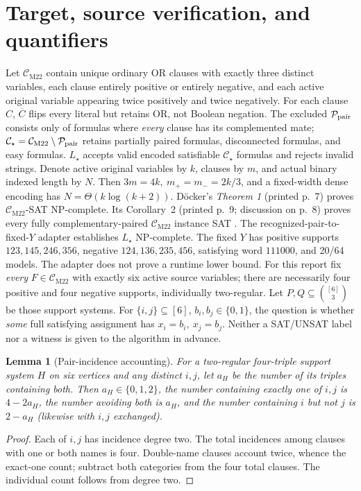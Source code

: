 \documentclass[11pt]{article}
\newtheorem{lemma}[theorem]{Lemma}
\newcommand{\CM}{\mathcal C_{\mathrm{M22}}}
\newcommand{\CS}{\mathcal C_{\star}}
\begin{document}
\section{Target, source verification, and quantifiers}
Let \(\CM\) contain unique ordinary OR clauses with exactly three distinct variables, each clause entirely positive or entirely negative, and each active original variable appearing twice positively and twice negatively. For each clause \(C\), \(\overline C\) flips every literal but retains OR, not Boolean negation. The excluded \(\mathcal P_{\rm pair}\) consists only of formulas where \emph{every} clause has its complemented mate; \(\CS=\CM\setminus\mathcal P_{\rm pair}\) retains partially paired formulas, disconnected formulas, and easy formulas. \(L_\star\) accepts valid encoded satisfiable \(\CS\) formulas and rejects invalid strings. Denote active original variables by \(k\), clauses by \(m\), and actual binary indexed length by \(N\). Then \(3m=4k,\ m_+=m_-=2k/3\), and a fixed-width dense encoding has \(N=\Theta(k\log(k+2))\).
D\"ocker's \emph{Theorem 1} (printed p.~7) proves \(\CM\)-SAT NP-complete. Its Corollary~2 (printed p.~9; discussion on p.~8) proves every fully complementary-paired \(\CM\) instance SAT \cite{Docker}. The recognized-pair-to-fixed-\(Y\) adapter establishes \(L_\star\) NP-complete. The fixed \(Y\) has positive supports \(123,145,246,356\), negative \(124,136,235,456\), satisfying word \(111000\), and 20/64 models. The adapter does not prove a runtime lower bound.
For this report fix \emph{every} \(F\in\CM\) with exactly six active source variables; there are necessarily four positive and four negative supports, individually two-regular. Let \(P,Q\subseteq{[6]\choose3}\) be those support systems. For \(\{i,j\}\subseteq[6]\), \(b_i,b_j\in\{0,1\}\), the question is whether \emph{some} full satisfying assignment has \(x_i=b_i,\ x_j=b_j\). Neither a SAT/UNSAT label nor a witness is given to the algorithm in advance.
\begin{lemma}[Pair-incidence accounting]\label{lem:inc}
For a two-regular four-triple support system \(H\) on six vertices and any distinct \(i,j\), let \(a_H\) be the number of its triples containing both. Then \(a_H\in\{0,1,2\}\), the number containing exactly one of \(i,j\) is \(4-2a_H\), the number avoiding both is \(a_H\), and the number containing \(i\) but not \(j\) is \(2-a_H\) (likewise with \(i,j\) exchanged).
\end{lemma}
\begin{proof}Each of \(i,j\) has incidence degree two. The total incidences among clauses with one or both names is four. Double-name clauses account twice, whence the exact-one count; subtract both categories from the four total clauses. The individual count follows from degree two.\end{proof}
\end{document}
